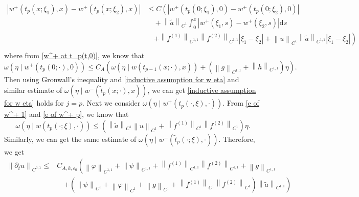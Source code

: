 \documentclass[a4paper,reqno,11pt]{amsart}
\numberwithin{equation}{section} %
\begin{document}
$$
\begin{aligned}
	\left| w^+\left( t_p\left( x;\xi _1 \right) ,x \right) -w^+\left( t_p\left( x;\xi _2 \right) ,x \right) \right|&\le C\left( \left| w^+\left( t_p\left( 0;\xi _1 \right) ,0 \right) -w^+\left( t_p\left( 0;\xi _2 \right) ,0 \right) \right| \right.\\
	&\quad  +\left\| \tilde{a} \right\| _{C^1}\int_0^x{\left| w^+\left( \xi _1,s \right) -w^+\left( \xi _2,s \right) \right|\mathrm{d}s}\\
	&\quad \left.  +\left\| f^{\left( 1 \right)} \right\| _{C^{1,1}}\left\| f^{\left( 2 \right)} \right\| _{C^{1,1}}\left| \xi _1-\xi _2 \right|+\left\| u \right\| _{C^1}\left\| \tilde{a} \right\| _{C^{1,1}}\left| \xi _1-\xi _2 \right| \right)\\
\end{aligned}
$$
where from \eqref{w^+ at t_p(t,0)}, we know that
$$
\omega \left( \eta \mid w^+\left( t_p\left( 0;\cdot \right) ,0 \right) \right) \leq C_{A} \left(\omega \left( \eta \mid w\left( t_{p-1}\left( x;\cdot \right) ,x \right)\right) +(\left\| g \right\| _{C^{1,1}}+\left\| h \right\| _{C^{1,1}})\eta \right)  .
$$
Then using Gronwall's inequality and \eqref{inductive assumption for w eta} and similar estimate of $\omega \left( \eta \mid w^-\left( \tilde{t}_p\left( x;\cdot \right) ,x \right) \right)$, we can get \eqref{inductive assumption for w eta} holds for $j=p$.
Next we consider $\omega\left(\eta \mid w^+\left(t_p(\cdot, \xi), \cdot\right)\right)$.
From \eqref{e of w^+ 1} and \eqref{e of w^+ p}, we know that
$$
\omega \left( \eta \mid w\left( t_p(\cdot ;\xi ),\cdot \right) \right) \leq \left( \left\| \tilde{a} \right\| _{C^1}\left\lVert u\right\rVert  _{C^1}+\left\| f^{(1)} \right\| _{C^1}\left\| f^{(2)} \right\| _{C^1} \right) \eta .
$$
Similarly, we can get the same estimate of $\omega \left( \eta \mid w^-\left( \tilde{t} _p(\cdot ;\xi ),\cdot \right) \right) $.
Therefore, we get
\begin{equation}
\begin{aligned}
\left\| \partial _t u \right\| _{C^{0,1}}\leq&  C_{A,k,\varepsilon _0}\left( \left\| \varphi \right\| _{C^{1,1}}+\left\| \psi \right\| _{C^{1,1}}+\left\| f^{(1)} \right\| _{C^{1,1}}\left\| f^{(2)} \right\| _{C^{1,1}}+\left\| g \right\| _{C^{1,1}}\right.\\
&\quad \left.+(\left\| \psi \right\| _{C^1}+\left\| \varphi \right\| _{C^1}+\left\| g \right\| _{C^1}+\left\| f^{(1)} \right\| _{C^1}\left\| f^{(2)} \right\| _{C^1})\left\| \tilde{a} \right\| _{C^{1,1}} \right) 
\end{aligned}
\end{equation}
\end{document}
